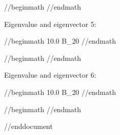 //begin{math}
\left[\begin{matrix}0\\0\\0\\0\\1.0\\0\end{matrix}\right]
//end{math}

Eigenvalue and eigenvector 5:

//begin{math}
10.0 B_{20}
//end{math}

//begin{math}
\left[\begin{matrix}1.0\\0\\0\\0\\0\\0\end{matrix}\right]
//end{math}

Eigenvalue and eigenvector 6:

//begin{math}
10.0 B_{20}
//end{math}

//begin{math}
\left[\begin{matrix}0\\0\\0\\0\\0\\1.0\end{matrix}\right]
//end{math}


//end{document}
